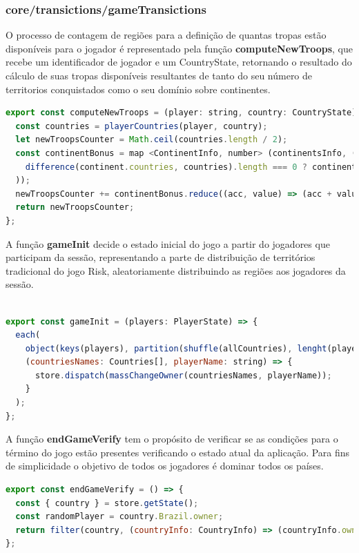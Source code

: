 \documentclass[rel_mlp]{iiufrgs}
\begin{document}
\subsubsection{core/transictions/gameTransictions}

O processo de contagem de regiões para a definição de quantas tropas estão disponíveis para o jogador é representado pela função \textbf{computeNewTroops}, que recebe um identificador de jogador e um CountryState, retornando o resultado do cálculo de suas tropas disponíveis resultantes de tanto do seu número de territorios conquistados como o seu domínio sobre continentes.
\begin{lstlisting}[language=JavaScript]
export const computeNewTroops = (player: string, country: CountryState) => {
  const countries = playerCountries(player, country);
  let newTroopsCounter = Math.ceil(countries.length / 2);
  const continentBonus = map <ContinentInfo, number> (continentsInfo, (continent: ContinentInfo) => (
    difference(continent.countries, countries).length === 0 ? continent.troopsBonus : 0
  ));
  newTroopsCounter += continentBonus.reduce((acc, value) => (acc + value), 0);
  return newTroopsCounter;
};
\end{lstlisting}


A função \textbf{gameInit} decide o estado inicial do jogo a partir do jogadores que participam da sessão, representando a parte de distribuição de territórios tradicional do jogo Risk, aleatoriamente distribuindo as regiões aos jogadores da sessão.
\begin{lstlisting}[language = JavaScript]

export const gameInit = (players: PlayerState) => {
  each(
    object(keys(players), partition(shuffle(allCountries), lenght(players))) as InitCountries,
    (countriesNames: Countries[], playerName: string) => {
      store.dispatch(massChangeOwner(countriesNames, playerName));
    }
  );
};
\end{lstlisting}

A função \textbf{endGameVerify} tem o propósito de verificar se as condições para o término do jogo estão presentes verificando o estado atual da aplicação. Para fins de simplicidade o objetivo de todos os jogadores é dominar todos os países.
\begin{lstlisting}[language = JavaScript]
export const endGameVerify = () => {
  const { country } = store.getState();
  const randomPlayer = country.Brazil.owner;
  return filter(country, (countryInfo: CountryInfo) => (countryInfo.owner !== randomPlayer)) === [];
};
\end{lstlisting}
\end{document}
